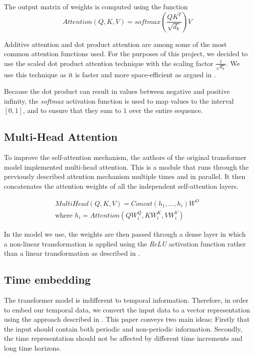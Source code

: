 The output matrix of weights is computed using the function
$$
Attention(Q, K, V) = softmax(\frac{QK^T}{\sqrt{d_k}})V
$$

Additive attention and dot product attention are among some of the most common attention functions used.
For the purposes of this project, we decided to use the scaled dot product attention technique with the scaling factor $\frac{1}{\sqrt{d_k}}$.
We use this technique as it is faster and more space-efficient as argued in \citet{AttentionIsAllYouNeed}.

Because the dot product can result in values between negative and positive infinity, the \textit{softmax} activation function is used to map values to the interval $[0,1]$, and to ensure that they sum to $1$ over the entire sequence.

\subsection{Multi-Head Attention}
To improve the self-attention mechanism, the authors of the original transformer model implemented multi-head attention.
This is a module that runs through the previously described attention mechanism multiple times and in parallel.
It then concatenates the attention weights of all the independent self-attention layers. 

\begin{align*}
MultiHead(Q, K, V) = Concat(h_1, \ldots, h_i)W^O \\
\text{where }h_i = Attention(QW^Q_i, KW^K_i, VW^V_i) 
\end{align*}

In the model we use, the weights are then passed through a dense layer in which a non-linear transformation is applied using the \textit{ReLU} activation function rather than a linear transformation as described in \citet{AttentionIsAllYouNeed}.

\subsection{Time embedding}
The transformer model is indifferent to temporal information.
Therefore, in order to embed our temporal data, we convert the input data to a vector representation using the approach described in \citet{time2vec}. 
This paper conveys two main ideas; Firstly that the input should contain both periodic and non-periodic information.  
Secondly, the time representation should not be affected by different time increments and long time horizons.  


